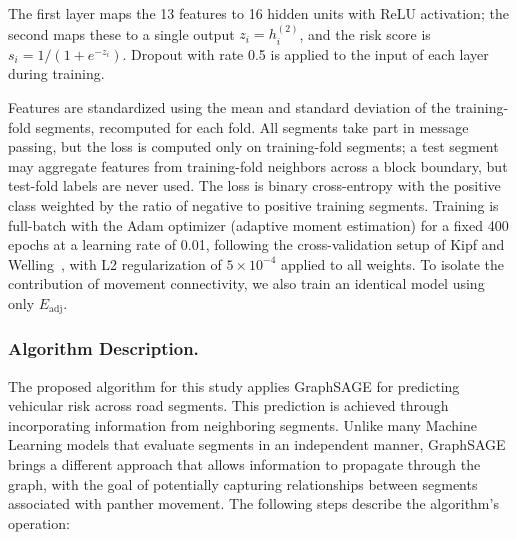 \documentclass[letterpaper]{article}
\begin{document}
The first layer maps the 13 features to 16 hidden units with ReLU activation;
the second maps these to a single output $z_i = h_i^{(2)}$, and the risk score is
$s_i = 1/(1 + e^{-z_i})$. Dropout with rate 0.5 is applied to the input of
each layer during training.

Features are standardized using the mean and standard deviation of the
training-fold segments, recomputed for each fold. All segments take part in
message passing, but the loss is computed only on training-fold segments;
a test segment may aggregate features from training-fold neighbors across a
block boundary, but test-fold labels are never used. The loss is binary
cross-entropy with the positive class weighted by the ratio of negative to
positive training segments. Training is full-batch with the Adam optimizer \cite{Kingma2015} (adaptive moment estimation) for a fixed 400 epochs at a learning rate of 0.01, following the cross-validation setup of Kipf and Welling~, with L2 regularization of $5 \times 10^{-4}$ applied to all weights. To isolate the contribution of movement connectivity, we also train an identical model using only $E_{\mathrm{adj}}$.

\subsubsection{Algorithm Description.} The proposed algorithm for this study applies GraphSAGE for predicting vehicular risk across road segments. This prediction is achieved through incorporating information from neighboring segments. Unlike many Machine Learning models that evaluate segments in an independent manner, GraphSAGE brings a different approach that allows information to propagate through the graph, with the goal of potentially capturing relationships between segments associated with panther movement.
The following steps describe the algorithm's operation:
\end{document}
